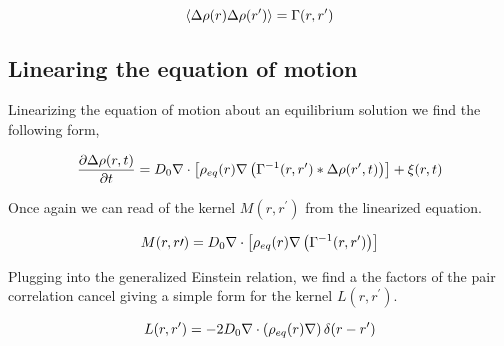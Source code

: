 \begin{equation} \left\langle \Delta\rho(r) \Delta\rho(r^\prime) \right\rangle =
\Gamma(r, r^\prime) \end{equation}

\subsection{Linearing the equation of motion}

Linearizing the equation of motion about an equilibrium solution we find the
following form,

\begin{equation} \frac{\partial \Delta \rho (r, t)}{\partial t} = D_0\nabla \cdot
\left[\rho_{eq}(r)\nabla \left(\Gamma^{-1}(r, r^\prime)\ast \Delta\rho(r^\prime,
t)\right)\right] + \xi(r, t) \end{equation}

Once again we can read of the kernel $M(r, r^\prime)$ from the linearized
equation.

\begin{equation} M(r, r\prime) = D_0\nabla \cdot \left[\rho_{eq}(r)\nabla
\left(\Gamma^{-1}(r, r^\prime)\right)\right] \end{equation}

Plugging into the generalized Einstein relation, we find a the factors of the
pair correlation cancel giving a simple form for the kernel $L(r, r^\prime)$.

\begin{equation} L(r, r^\prime) =
-2D_0\nabla\cdot\left(\rho_{eq}(r)\nabla\right)\delta(r - r^\prime) \end{equation}

\nocite{Ronis, Fox_and_Uhlenbeck, Lax}
